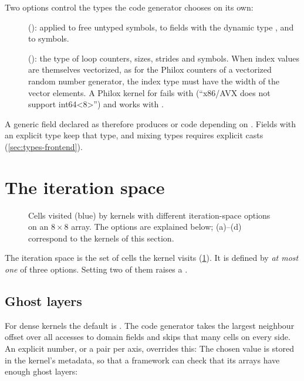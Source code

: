 Two options control the types the code generator chooses on its own:
\begin{description}
  \item[] (): applied to free untyped symbols, to
        fields with the dynamic type , and to
         symbols.
  \item[] (): the type of loop counters, sizes, strides
        and  symbols. When index values are themselves
        vectorized, as for the Philox counters of a vectorized random number generator,
        the index type must have the width of the vector elements. A 
        Philox kernel for  fails with  (``x86/AVX does not
        support int64<8>'') and works with .
\end{description}
A generic field declared as  therefore produces  or
 code depending on . Fields with an explicit type keep
that type, and mixing types requires explicit casts (\cref{sec:types-frontend}).

\section{The iteration space}\label{sec:iteration-space}


\begin{figure}[htbp]
  \centering
  
  \caption[Iteration-space options]{Cells visited (blue) by kernels with different iteration-space options on an $8\times8$ array. The options are explained below; (a)--(d) correspond to the kernels of this section.}
  \label{fig:ispaces}
\end{figure}

The iteration space is the set of cells the kernel visits (\cref{fig:ispaces}). It is defined by \emph{at
most one} of three options. Setting two of them raises a .

\subsection{Ghost layers}
For dense kernels the default is . The code generator takes the
largest neighbour offset over all accesses to domain fields and skips that many cells on
every side. An explicit number, or a  pair per axis, overrides this:
The chosen value is stored in the kernel's metadata, so that a framework can check that
its arrays have enough ghost layers:

